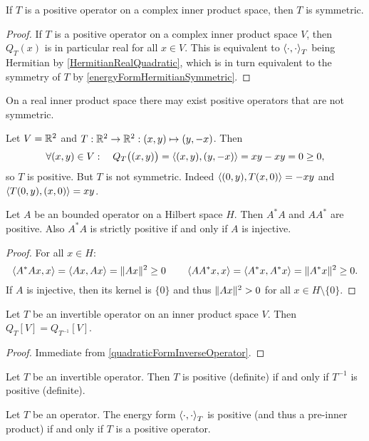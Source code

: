 \begin{lemma} \label{positiveOperatorSymmetric}
If $T$ is a positive operator on a complex inner product space, then $T$ is symmetric.
\end{lemma}
\begin{proof}
If $T$ is a positive operator on a complex inner product space $V$, then $Q_T(x)$ is in particular real for all $x\in V$. This is equivalent to $\left\langle \cdot,\cdot \right\rangle_T$ being Hermitian by \ref{HermitianRealQuadratic}, which is in turn equivalent to the symmetry of $T$ by \ref{energyFormHermitianSymmetric}.
\end{proof}

On a real inner product space there may exist positive operators that are not symmetric.
\begin{example}
Let $V= \mathbb{R}^2$ and $T: \mathbb{R}^2 \to\mathbb{R}^2: (x,y)\mapsto (y,-x)$. Then
\[ \forall (x,y)\in V: \quad Q_T\big((x,y)\big) = \left\langle (x,y), (y,-x) \right\rangle = xy -xy = 0 \geq 0, \]
so $T$ is positive. But $T$ is not symmetric. Indeed $\left\langle (0,y), T(x,0) \right\rangle = -xy$ and $\left\langle T(0,y), (x, 0) \right\rangle = xy$.
\end{example}

\begin{lemma}
Let $A$ be an bounded operator on a Hilbert space $H$. Then $A^*A$ and $AA^*$ are positive. Also $A^*A$ is strictly positive \textup{if and only if} $A$ is injective.
\end{lemma}
\begin{proof}
For all $x\in H$:
\[ \left\langle A^*Ax,x \right\rangle = \left\langle Ax,Ax \right\rangle = \lVert Ax\rVert^2 \geq 0 \qquad \left\langle AA^*x,x \right\rangle = \left\langle A^*x,A^*x \right\rangle = \lVert A^*x\rVert^2 \geq 0. \]
If $A$ is injective, then its kernel is $\{0\}$ and thus $\lVert Ax\rVert^2 > 0$ for all $x\in H\setminus\{0\}$.
\end{proof}

\begin{lemma}
Let $T$ be an invertible operator on an inner product space $V$. Then $Q_T[V] = Q_{T^{-1}}[V]$.
\end{lemma}
\begin{proof}
Immediate from \ref{quadraticFormInverseOperator}.
\end{proof}
\begin{corollary}
Let $T$ be an invertible operator. Then $T$ is positive (definite) \textup{if and only if} $T^{-1}$ is positive (definite).
\end{corollary}

\begin{lemma} \label{positiveOperatorPositiveEnergyForm}
Let $T$ be an operator. The energy form $\left\langle \cdot,\cdot \right\rangle_T$ is positive (and thus a pre-inner product) \textup{if and only if} $T$ is a positive operator.
\end{lemma}

